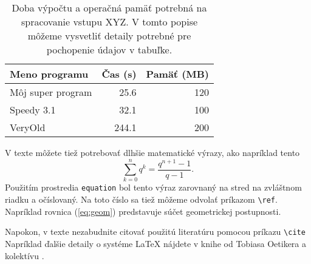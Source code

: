 \begin{table}
\caption[Doba výpočtu a operačná pamäť potrebná na spracovanie vstupu XYZ]{Doba výpočtu a operačná pamäť potrebná na spracovanie vstupu XYZ. V tomto popise môžeme vysvetliť detaily potrebné pre pochopenie údajov v tabuľke.}
\label{tab:cas}
\begin{center}
\begin{tabular}{lrr}
\hline 
Meno programu & Čas (s) & Pamäť (MB) \\
\hline
Môj super program & 25.6 & 120 \\
Speedy 3.1  & 32.1 & 100 \\
VeryOld & 244.1 & 200 \\
\hline
\end{tabular}
\end{center}
\end{table}

V texte môžete tiež potrebovať dlhšie matematické výrazy, ako napríklad tento
\begin{equation}
\sum_{k=0}^n q^k = \frac{q^{n+1}-1}{q-1}.
\label{eq:geom}
\end{equation}
Použitím prostredia \verb'equation' bol tento výraz zarovnaný na stred na
zvláštnom riadku a očíslovaný. Na toto číslo sa tiež môžeme odvolať
príkazom \verb'\ref'. Napríklad rovnica (\ref{eq:geom}) predstavuje súčet 
geometrickej postupnosti.

Napokon, v texte nezabudnite citovať použitú literatúru pomocou príkazu 
\verb'\cite'  Napríklad ďalšie detaily o systéme LaTeX nájdete v knihe od Tobiasa Oetikera a kolektívu \cite{Oetiker2000}.



